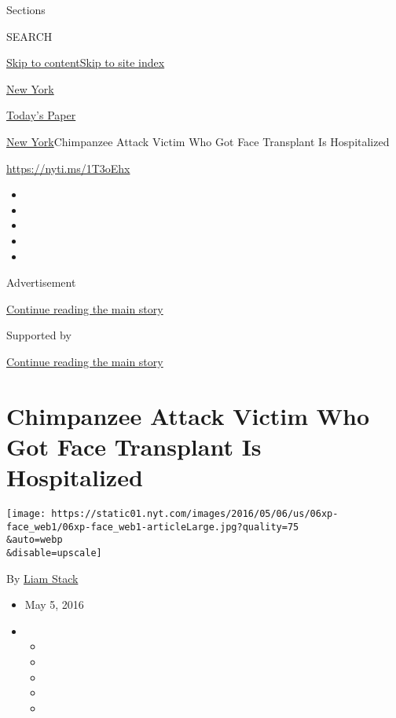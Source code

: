 Sections

SEARCH

\protect\hyperlink{site-content}{Skip to
content}\protect\hyperlink{site-index}{Skip to site index}

\href{https://www.nytimes.com/section/nyregion}{New York}

\href{https://myaccount.nytimes.com/auth/login?response_type=cookie\&client_id=vi}{}

\href{https://www.nytimes.com/section/todayspaper}{Today's Paper}

\href{/section/nyregion}{New York}\textbar{}Chimpanzee Attack Victim Who
Got Face Transplant Is Hospitalized

\url{https://nyti.ms/1T3oEhx}

\begin{itemize}
\item
\item
\item
\item
\item
\end{itemize}

Advertisement

\protect\hyperlink{after-top}{Continue reading the main story}

Supported by

\protect\hyperlink{after-sponsor}{Continue reading the main story}

\hypertarget{chimpanzee-attack-victim-who-got-face-transplant-is-hospitalized}{%
\section{Chimpanzee Attack Victim Who Got Face Transplant Is
Hospitalized}\label{chimpanzee-attack-victim-who-got-face-transplant-is-hospitalized}}

\texttt{[image: https://static01.nyt.com/images/2016/05/06/us/06xp-face\_web1/06xp-face\_web1-articleLarge.jpg?quality=75\\\&auto=webp\\\&disable=upscale]}

By \href{http://www.nytimes.com/by/liam-stack}{Liam Stack}

\begin{itemize}
\item
  May 5, 2016
\item
  \begin{itemize}
  \item
  \item
  \item
  \item
  \item
  \end{itemize}
\end{itemize}

